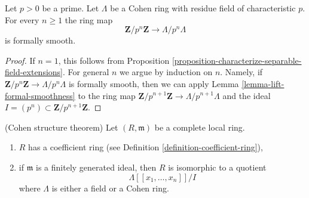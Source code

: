 \begin{lemma}
\label{lemma-cohen-ring-formally-smooth}
Let $p > 0$ be a prime.
Let $\Lambda$ be a Cohen ring with residue field of characteristic $p$.
For every $n \geq 1$ the ring map
$$
\mathbf{Z}/p^n\mathbf{Z} \to \Lambda/p^n\Lambda
$$
is formally smooth.
\end{lemma}

\begin{proof}
If $n = 1$, this follows from
Proposition \ref{proposition-characterize-separable-field-extensions}.
For general $n$ we argue by induction on $n$.
Namely, if $\mathbf{Z}/p^n\mathbf{Z} \to \Lambda/p^n\Lambda$ is
formally smooth, then we can apply Lemma \ref{lemma-lift-formal-smoothness}
to the ring map
$\mathbf{Z}/p^{n + 1}\mathbf{Z} \to \Lambda/p^{n + 1}\Lambda$
and the ideal $I = (p^n) \subset \mathbf{Z}/p^{n + 1}\mathbf{Z}$.
\end{proof}

\begin{theorem}
\label{theorem-cohen-structure-theorem}
(Cohen structure theorem)
Let $(R, \mathfrak m)$ be a complete local ring.
\begin{enumerate}
\item $R$ has a coefficient ring (see
Definition \ref{definition-coefficient-ring}),
\item if $\mathfrak m$ is a finitely generated ideal, then
$R$ is isomorphic to a quotient
$$
\Lambda[[x_1, \ldots, x_n]]/I
$$
where $\Lambda$ is either a field or a Cohen ring.
\end{enumerate}
\end{theorem}

